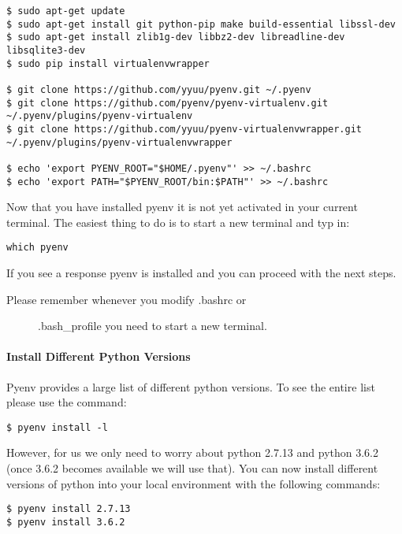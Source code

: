\begin{verbatim}
$ sudo apt-get update
$ sudo apt-get install git python-pip make build-essential libssl-dev
$ sudo apt-get install zlib1g-dev libbz2-dev libreadline-dev libsqlite3-dev
$ sudo pip install virtualenvwrapper

$ git clone https://github.com/yyuu/pyenv.git ~/.pyenv
$ git clone https://github.com/pyenv/pyenv-virtualenv.git ~/.pyenv/plugins/pyenv-virtualenv   
$ git clone https://github.com/yyuu/pyenv-virtualenvwrapper.git ~/.pyenv/plugins/pyenv-virtualenvwrapper

$ echo 'export PYENV_ROOT="$HOME/.pyenv"' >> ~/.bashrc
$ echo 'export PATH="$PYENV_ROOT/bin:$PATH"' >> ~/.bashrc
\end{verbatim}

Now that you have installed pyenv it is not yet activated in your
current terminal. The easiest thing to do is to start a new terminal and
typ in:

\begin{verbatim}
which pyenv
\end{verbatim}

If you see a response pyenv is installed and you can proceed with the
next steps.

\begin{description}
\item[Please remember whenever you modify .bashrc or]
.bash\_profile you need to start a new terminal.
\end{description}

\paragraph{Install Different Python
Versions}\label{install-different-python-versions}

Pyenv provides a large list of different python versions. To see the
entire list please use the command:

\begin{verbatim}
$ pyenv install -l
\end{verbatim}

However, for us we only need to worry about python 2.7.13 and python
3.6.2 (once 3.6.2 becomes available we will use that). You can now
install different versions of python into your local environment with
the following commands:

\begin{verbatim}
$ pyenv install 2.7.13
$ pyenv install 3.6.2
\end{verbatim}

